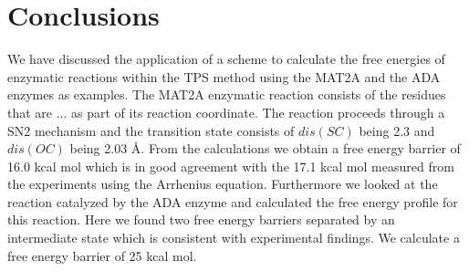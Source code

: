 \documentclass[journal=jpcbfk,manuscript=article,layout=twocolumn]{achemso}
\begin{document}
\section{Conclusions}
We have discussed the application of a scheme to calculate the 
free energies of enzymatic reactions within the TPS method using the MAT2A
and the ADA enzymes as examples. The MAT2A enzymatic reaction consists of 
the residues that are ... as part of its reaction coordinate. The reaction 
proceeds through a SN2 mechanism and the transition state consists of 
$dis(SC)$ being 2.3 and $dis(OC)$ being 2.03 {\AA}. From the calculations 
we obtain a free energy barrier of 16.0 kcal mol which is in good agreement 
with the 17.1 kcal mol measured from the experiments using the Arrhenius equation.
Furthermore we looked at the reaction catalyzed by the ADA enzyme and 
calculated the free energy profile for this reaction. Here we found two free energy
barriers separated by an intermediate state which is consistent with 
experimental findings. We calculate a free energy barrier of 25 kcal mol.  

\begin{acknowledgement}


\end{acknowledgement}

\begin{suppinfo}


\end{suppinfo}


\end{document}
